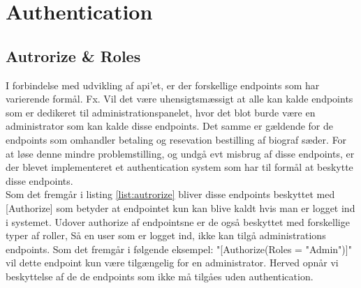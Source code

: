 ﻿\section{Authentication}


\subsection{Autrorize \& Roles}
I forbindelse med udvikling af api'et, er der forskellige endpoints som har varierende formål. Fx. Vil det være
uhensigtsmæssigt at alle kan kalde endpoints som er dedikeret til administrationspanelet, hvor det blot burde være
en administrator som kan kalde disse endpoints. Det samme er gældende for de endpoints som omhandler betaling og
resevation bestilling af biograf sæder. For at løse denne mindre problemstilling, og undgå evt misbrug af disse 
endpoints, er der blevet implementeret et authentication system som har til formål at beskytte disse endpoints.\\


Som det fremgår i listing \ref{list:autrorize} bliver disse endpoints beskyttet med [Authorize] som betyder at
endpointet kun kan blive kaldt hvis man er logget ind i systemet. Udover authorize af endpointsne er de også beskyttet 
med forskellige typer af roller, Så en user som er logget ind, ikke kan tilgå administrations endpoints.
Som det fremgår i følgende eksempel: "[Authorize(Roles = "Admin")]" vil dette endpoint kun være tilgængelig
for en administrator. Herved opnår vi beskyttelse af de de endpoints som ikke må tilgåes uden authentication. 